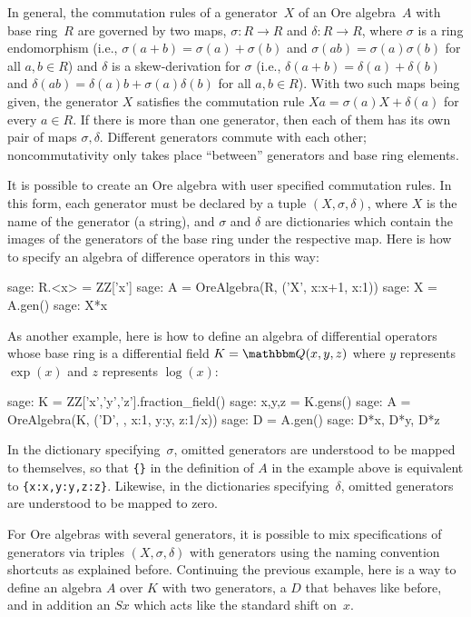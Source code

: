 \documentclass{amsart}
\let\set\mathbbm
\begin{document}
In general, the commutation rules of a generator~$X$ of an Ore algebra~$A$ with
base ring~$R$ are governed by two maps, $\sigma\colon R\to R$ and $\delta\colon R\to R$,
where $\sigma$ is a ring endomorphism (i.e., $\sigma(a+b)=\sigma(a)+\sigma(b)$ and
$\sigma(ab)=\sigma(a)\sigma(b)$ for all $a,b\in R$) and $\delta$ is a skew-derivation
for $\sigma$ (i.e., $\delta(a+b)=\delta(a)+\delta(b)$ and $\delta(ab)=\delta(a)b
+\sigma(a)\delta(b)$ for all $a,b\in R$). With two such maps being given, the
generator $X$ satisfies the commutation rule $Xa=\sigma(a)X+\delta(a)$ for every
$a\in R$. If there is more than one generator, then each of them has its own pair
of maps $\sigma,\delta$. Different generators commute with each other; 
noncommutativity only takes place ``between'' generators and base ring elements. 

It is possible to create an Ore algebra with user specified commutation rules.
In this form, each generator must be declared by a tuple $(X,\sigma,\delta)$, 
where $X$ is the name of the generator (a string), and $\sigma$ and $\delta$
are dictionaries which contain the images of the generators of the base
ring under the respective map. Here is how to specify an algebra of difference
operators in this way:

\begin{sageexample}
  sage: R.<x> = ZZ['x']
  sage: A = OreAlgebra(R, ('X', {x:x+1}, {x:1}))
  sage: X = A.gen()
  sage: X*x
\end{sageexample}

As another example, here is how to define an algebra of differential operators 
whose base ring is a differential field $K=\set Q(x,y,z)$ where $y$ represents
$\exp(x)$ and $z$ represents $\log(x)$:

\begin{sageexample}
  sage: K = ZZ['x','y','z'].fraction_field()
  sage: x,y,z = K.gens()
  sage: A = OreAlgebra(K, ('D', {}, {x:1, y:y, z:1/x}))
  sage: D = A.gen()
  sage: D*x, D*y, D*z
\end{sageexample}

In the dictionary specifying~$\sigma$, omitted generators are understood to be
mapped to themselves, so that \verb|{}| in the definition of $A$ in the example
above is equivalent to \verb|{x:x,y:y,z:z}|.  Likewise, in the dictionaries
specifying~$\delta$, omitted generators are understood to be mapped to zero.

For Ore algebras with several generators, it is possible to mix specifications
of generators via triples $(X,\sigma,\delta)$ with generators using the naming
convention shortcuts as explained before. Continuing the previous example,
here is a way to define an algebra $A$ over $K$ with two generators, a $D$ 
that behaves like before, and in addition an $Sx$ which acts like the standard
shift on~$x$.
\end{document}
